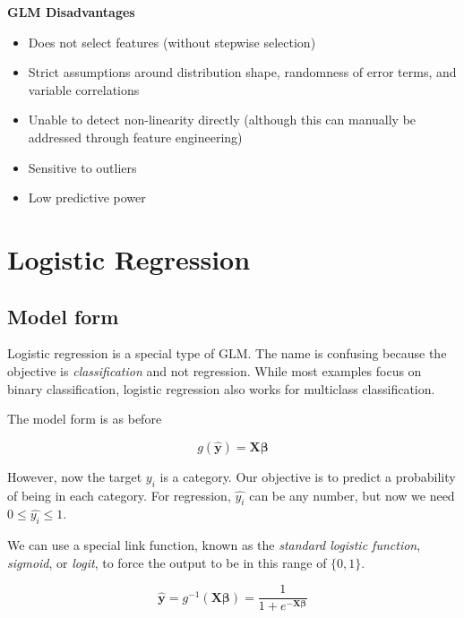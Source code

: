 \documentclass[openany]{book}
\providecommand{\tightlist}{%
  \setlength{\itemsep}{0pt}\setlength{\parskip}{0pt}}
\begin{document}
\textbf{GLM Disadvantages}

\begin{itemize}
\tightlist
\item
  Does not select features (without stepwise selection)
\item
  Strict assumptions around distribution shape, randomness of error terms, and variable correlations
\item
  Unable to detect non-linearity directly (although this can manually be addressed through feature engineering)
\item
  Sensitive to outliers
\item
  Low predictive power
\end{itemize}

\hypertarget{logistic-regression}{%
\chapter{Logistic Regression}\label{logistic-regression}}

\hypertarget{model-form}{%
\section{Model form}\label{model-form}}

Logistic regression is a special type of GLM. The name is confusing because the objective is \emph{classification} and not regression. While most examples focus on binary classification, logistic regression also works for multiclass classification.

The model form is as before

\[g(\mathbf{\hat{y}}) = \mathbf{X} \mathbf{\beta}\]

However, now the target \(y_i\) is a category. Our objective is to predict a probability of being in each category. For regression, \(\hat{y_i}\) can be any number, but now we need \(0 \leq \hat{y_i} \leq 1\).

We can use a special link function, known as the \emph{standard logistic function}, \emph{sigmoid}, or \emph{logit}, to force the output to be in this range of \(\{0,1\}\).

\[\mathbf{\hat{y}} = g^{-1}(\mathbf{X} \mathbf{\beta}) = \frac{1}{1 + e^{-\mathbf{X} \mathbf{\beta}}}\]
\end{document}
